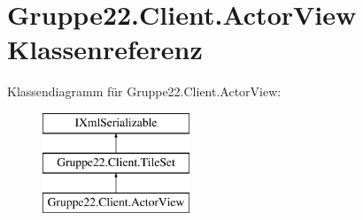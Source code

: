 \hypertarget{class_gruppe22_1_1_client_1_1_actor_view}{\section{Gruppe22.\-Client.\-Actor\-View Klassenreferenz}
\label{class_gruppe22_1_1_client_1_1_actor_view}
}
Klassendiagramm für Gruppe22.\-Client.\-Actor\-View\-:\begin{figure}[H]
\begin{center}
\leavevmode
\includegraphics[height=3.000000cm]{class_gruppe22_1_1_client_1_1_actor_view}
\end{center}
\end{figure}
